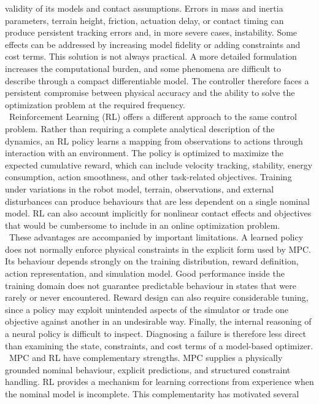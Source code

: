 validity of its models and contact assumptions. Errors in mass and inertia
parameters, terrain height, friction, actuation delay, or contact timing can
produce persistent tracking errors and, in more severe cases, instability.
Some effects can be addressed by increasing model fidelity or adding
constraints and cost terms. This solution is not always practical. A more
detailed formulation increases the computational burden, and some phenomena
are difficult to describe through a compact differentiable model. The
controller therefore faces a persistent compromise between physical accuracy
and the ability to solve the optimization problem at the required frequency.\\
\
Reinforcement Learning (RL) offers a different approach to the same control problem.
Rather than requiring a complete analytical description of the dynamics, an RL
policy learns a mapping from observations to actions through interaction with
an environment. The policy is optimized to maximize the expected cumulative
reward, which can include velocity tracking, stability, energy consumption,
action smoothness, and other task-related objectives. Training under variations
in the robot model, terrain, observations, and external disturbances can
produce behaviours that are less dependent on a single nominal model. RL can
also account implicitly for nonlinear contact effects and objectives that would
be cumbersome to include in an online optimization problem.\\
\
These advantages are accompanied by important limitations. A learned policy
does not normally enforce physical constraints in the explicit form used by
MPC. Its behaviour depends strongly on the training distribution, reward
definition, action representation, and simulation model. Good performance
inside the training domain does not guarantee predictable behaviour in states
that were rarely or never encountered. Reward design can also require
considerable tuning, since a policy may exploit unintended aspects of the
simulator or trade one objective against another in an undesirable way.
Finally, the internal reasoning of a neural policy is difficult to inspect.
Diagnosing a failure is therefore less direct than examining the state,
constraints, and cost terms of a model-based optimizer.\\
\
MPC and RL have complementary strengths. MPC supplies a physically grounded
nominal behaviour, explicit predictions, and structured constraint handling.
RL provides a mechanism for learning corrections from experience when the
nominal model is incomplete. This complementarity has motivated several
